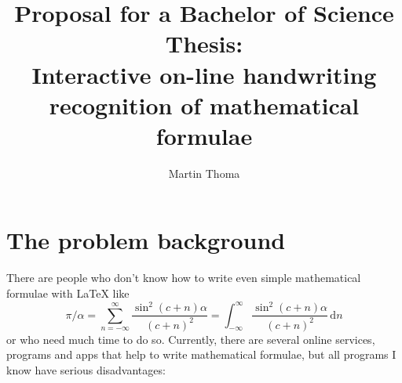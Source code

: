 \documentclass[a4paper]{scrartcl}
\begin{document}
    \title{Proposal for a Bachelor of Science Thesis:\\Interactive on-line handwriting recognition of mathematical formulae}
    \author{Martin Thoma}
    \maketitle
\section{The problem background}
    There are people who don't know how to write even
    simple mathematical formulae with \LaTeX{} like
    \[\pi/\alpha=\sum_{n=-\infty}^\infty \frac{\sin^2 (c+n)\alpha}{(c+n)^2}=\int_{-\infty}^\infty \frac{\sin^2 (c+n)\alpha}{(c+n)^2}\, \text{d}n\]
    or who need much time to do so. Currently, there are several online
    services, programs and apps that help to write mathematical
    formulae, but all programs I know have serious disadvantages:
\end{document}
